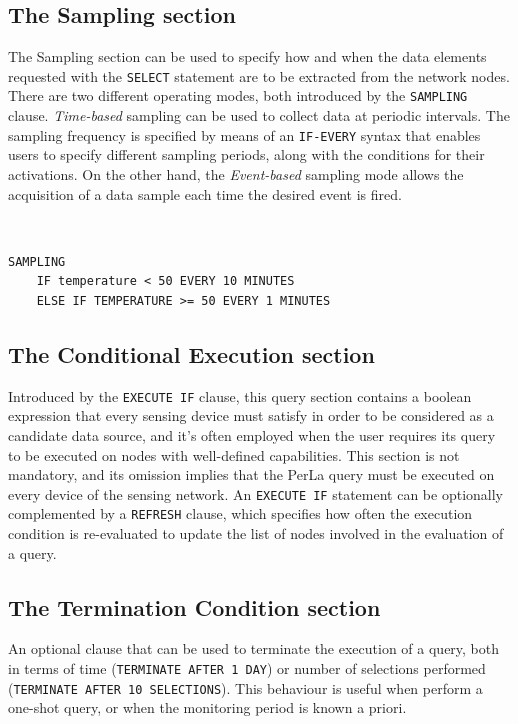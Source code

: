 \subsection{The Sampling section}

The Sampling section can be used to specify how and when the data elements
requested with the \texttt{SELECT} statement are to be extracted from the
network nodes. There are two different operating modes, both introduced by the
\texttt{SAMPLING} clause. \textit{Time-based} sampling can be used to collect
data at periodic intervals. The sampling frequency is specified by means of an
\texttt{IF-EVERY} syntax that enables users to specify different sampling
periods, along with the conditions for their activations. On the other hand,
the \textit{Event-based} sampling mode allows the acquisition of a data sample
each time the desired event is fired.

~\\
\begin{lstlisting}[caption={An example of time-based sampling, which shows how
the sampling frequency can be increased as the monitored phenomenon evolves.}]
SAMPLING
    IF temperature < 50 EVERY 10 MINUTES
    ELSE IF TEMPERATURE >= 50 EVERY 1 MINUTES
\end{lstlisting}

\subsection{The Conditional Execution section}

Introduced by the \texttt{EXECUTE IF} clause, this query section contains a
boolean expression that every sensing device must satisfy in order to be
considered as a candidate data source, and it's often employed when the user
requires its query to be executed on nodes with well-defined capabilities. This
section is not mandatory, and its omission implies that the PerLa query must be
executed on every device of the sensing network. An \texttt{EXECUTE IF}
statement can be optionally complemented by a \texttt{REFRESH} clause, which
specifies how often the execution condition is re-evaluated to update the list
of nodes involved in the evaluation of a query. 

\subsection{The Termination Condition section}

An optional clause that can be used to terminate the execution of a query, both
in terms of time (\lstinline!TERMINATE AFTER 1 DAY!) or number of selections
performed (\lstinline!TERMINATE AFTER 10 SELECTIONS!). This behaviour is useful
when perform a one-shot query, or when the monitoring period is known a priori.

